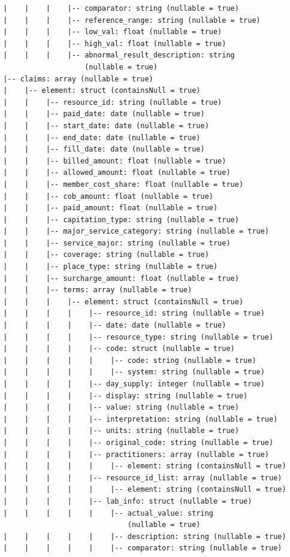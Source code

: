 \documentclass[letterpaper]{article} %
\begin{document}
\begin{verbatim}
 |    |    |    |-- comparator: string (nullable = true)
 |    |    |    |-- reference_range: string (nullable = true)
 |    |    |    |-- low_val: float (nullable = true)
 |    |    |    |-- high_val: float (nullable = true)
 |    |    |    |-- abnormal_result_description: string 
                    (nullable = true)
 |-- claims: array (nullable = true)
 |    |-- element: struct (containsNull = true)
 |    |    |-- resource_id: string (nullable = true)
 |    |    |-- paid_date: date (nullable = true)
 |    |    |-- start_date: date (nullable = true)
 |    |    |-- end_date: date (nullable = true)
 |    |    |-- fill_date: date (nullable = true)
 |    |    |-- billed_amount: float (nullable = true)
 |    |    |-- allowed_amount: float (nullable = true)
 |    |    |-- member_cost_share: float (nullable = true)
 |    |    |-- cob_amount: float (nullable = true)
 |    |    |-- paid_amount: float (nullable = true)
 |    |    |-- capitation_type: string (nullable = true)
 |    |    |-- major_service_category: string (nullable = true)
 |    |    |-- service_major: string (nullable = true)
 |    |    |-- coverage: string (nullable = true)
 |    |    |-- place_type: string (nullable = true)
 |    |    |-- surcharge_amount: float (nullable = true)
 |    |    |-- terms: array (nullable = true)
 |    |    |    |-- element: struct (containsNull = true)
 |    |    |    |    |-- resource_id: string (nullable = true)
 |    |    |    |    |-- date: date (nullable = true)
 |    |    |    |    |-- resource_type: string (nullable = true)
 |    |    |    |    |-- code: struct (nullable = true)
 |    |    |    |    |    |-- code: string (nullable = true)
 |    |    |    |    |    |-- system: string (nullable = true)
 |    |    |    |    |-- day_supply: integer (nullable = true)
 |    |    |    |    |-- display: string (nullable = true)
 |    |    |    |    |-- value: string (nullable = true)
 |    |    |    |    |-- interpretation: string (nullable = true)
 |    |    |    |    |-- units: string (nullable = true)
 |    |    |    |    |-- original_code: string (nullable = true)
 |    |    |    |    |-- practitioners: array (nullable = true)
 |    |    |    |    |    |-- element: string (containsNull = true)
 |    |    |    |    |-- resource_id_list: array (nullable = true)
 |    |    |    |    |    |-- element: string (containsNull = true)
 |    |    |    |    |-- lab_info: struct (nullable = true)
 |    |    |    |    |    |-- actual_value: string 
                              (nullable = true)
 |    |    |    |    |    |-- description: string (nullable = true)
 |    |    |    |    |    |-- comparator: string (nullable = true)

\end{verbatim}
\end{document}

